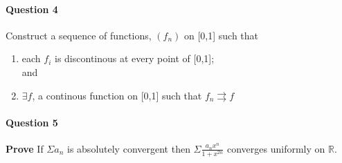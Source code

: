 \documentclass[20pt,a4paper]{extarticle} %
\begin{document}
\paragraph{Question 4}
Construct a sequence of functions, $(f_n)$  on [0,1] such that
	\begin{enumerate}[label=(\alph*)]
		\item each $f_i$ is discontinous at every point of [0,1]; \\
			and
		\item $\exists f$, a continous function on [0,1] such that $f_n \rightrightarrows f$
	\end{enumerate}
\paragraph{Question 5}
\textbf{Prove} If $\Sigma a_n$ is absolutely convergent then $\Sigma \frac{a_n x^n}{1+x^{2n}}$ converges uniformly on $\mathbb{R}.$
\end{document}
